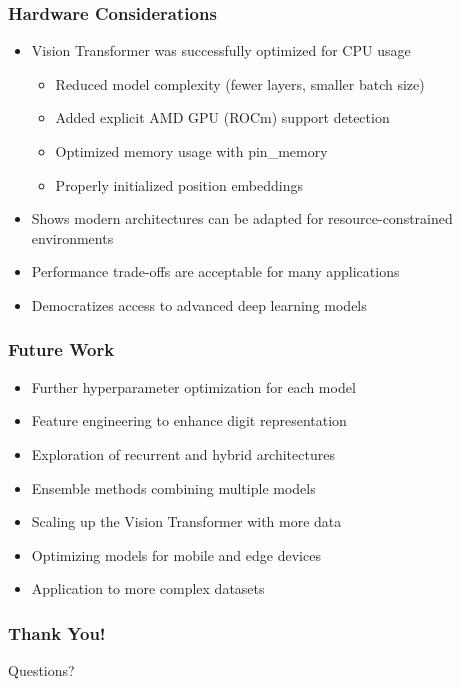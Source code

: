 \documentclass{beamer}
\begin{document}
\begin{frame}
\frametitle{Hardware Considerations}

\begin{itemize}
    \item Vision Transformer was successfully optimized for CPU usage
    \begin{itemize}
        \item Reduced model complexity (fewer layers, smaller batch size)
        \item Added explicit AMD GPU (ROCm) support detection
        \item Optimized memory usage with pin\_memory
        \item Properly initialized position embeddings
    \end{itemize}
    \item Shows modern architectures can be adapted for resource-constrained environments
    \item Performance trade-offs are acceptable for many applications
    \item Democratizes access to advanced deep learning models
\end{itemize}

\end{frame}

\begin{frame}
\frametitle{Future Work}

\begin{itemize}
    \item Further hyperparameter optimization for each model
    \item Feature engineering to enhance digit representation
    \item Exploration of recurrent and hybrid architectures
    \item Ensemble methods combining multiple models
    \item Scaling up the Vision Transformer with more data
    \item Optimizing models for mobile and edge devices
    \item Application to more complex datasets
\end{itemize}

\end{frame}

\begin{frame}
\frametitle{Thank You!}

\begin{center}
\huge{Questions?}
\end{center}

\end{frame}
\end{document}
